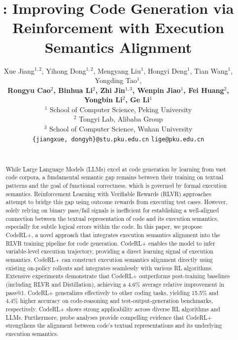 \documentclass{article}
\title{ 
\ourapproach: Improving Code Generation via Reinforcement with Execution Semantics Alignment
}
\author{Xue Jiang$^{1,2}$, Yihong Dong$^{1,2}$, Mengyang Liu$^{1}$, Hongyi Deng$^{1}$, Tian Wang$^{1}$, Yongding Tao$^{1}$, \\ \textbf{Rongyu Cao$^{2}$, Binhua Li$^{2}$, Zhi Jin$^{1,3}$, Wenpin Jiao$^{1}$, Fei Huang$^{2}$, Yongbin Li$^{2}$, Ge Li$^{1}$}\\
$^1$ School of Computer Science, Peking University \\$^2$ Tongyi Lab, Alibaba Group\\$^3$ School of Computer Science, Wuhan University\\
\texttt{\{jiangxue, dongyh\}@stu.pku.edu.cn} \quad \texttt{lige@pku.edu.cn}\\\
}
\DeclareRobustCommand{\ourapproach}{{\sc CodeRL+}\xspace}
\theoremstyle{definition}
\theoremstyle{remark}
\begin{document}
\maketitle

\begin{abstract}
While Large Language Models (LLMs) excel at code generation by learning from vast code corpora, a fundamental semantic gap remains between their training on textual patterns and the goal of functional correctness, which is governed by formal execution semantics. Reinforcement Learning with Verifiable Rewards (RLVR) approaches attempt to bridge this gap using outcome rewards from executing test cases. However, solely relying on binary pass/fail signals is inefficient for establishing a well-aligned connection between the textual representation of code and its execution semantics, especially for subtle logical errors within the code.
In this paper, we propose \ourapproach, a novel approach that integrates execution semantics alignment into the RLVR training pipeline for code generation. \ourapproach enables the model to infer variable-level execution trajectory, providing a direct learning signal of execution semantics. \ourapproach can construct execution semantics alignment directly using existing on-policy rollouts and integrates seamlessly with various RL algorithms.
Extensive experiments demonstrate that \ourapproach outperforms post-training baselines (including RLVR and Distillation), achieving a 4.6\% average relative improvement in pass@1. \ourapproach generalizes effectively to other coding tasks, yielding 15.5\% and 4.4\% higher accuracy on code-reasoning and test-output-generation benchmarks, respectively. \ourapproach shows strong applicability across diverse RL algorithms and LLMs. Furthermore, probe analyses provide compelling evidence that \ourapproach strengthens the alignment between code's textual representations and its underlying execution semantics.
\end{abstract}

\renewcommand{\thefootnote}{\fnsymbol{footnote}}


\renewcommand{\thefootnote}{\arabic{footnote}}
\end{document}
